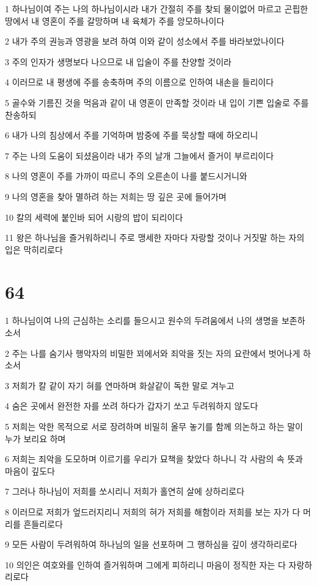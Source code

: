 \par 1 하나님이여 주는 나의 하나님이시라 내가 간절히 주를 찾되 물이없어 마르고 곤핍한 땅에서 내 영혼이 주를 갈망하며 내 육체가 주를 앙모하나이다
\par 2 내가 주의 권능과 영광을 보려 하여 이와 같이 성소에서 주를 바라보았나이다
\par 3 주의 인자가 생명보다 나으므로 내 입술이 주를 찬양할 것이라
\par 4 이러므로 내 평생에 주를 송축하며 주의 이름으로 인하여 내손을 들리이다
\par 5 골수와 기름진 것을 먹음과 같이 내 영혼이 만족할 것이라 내 입이 기쁜 입술로 주를 찬송하되
\par 6 내가 나의 침상에서 주를 기억하며 밤중에 주를 묵상할 때에 하오리니
\par 7 주는 나의 도움이 되셨음이라 내가 주의 날개 그늘에서 즐거이 부르리이다
\par 8 나의 영혼이 주를 가까이 따르니 주의 오른손이 나를 붙드시거니와
\par 9 나의 영혼을 찾아 멸하려 하는 저희는 땅 깊은 곳에 들어가며
\par 10 칼의 세력에 붙인바 되어 시랑의 밥이 되리이다
\par 11 왕은 하나님을 즐거워하리니 주로 맹세한 자마다 자랑할 것이나 거짓말 하는 자의 입은 막히리로다

\chapter{64}

\par 1 하나님이여 나의 근심하는 소리를 들으시고 원수의 두려움에서 나의 생명을 보존하소서
\par 2 주는 나를 숨기사 행악자의 비밀한 꾀에서와 죄악을 짓는 자의 요란에서 벗어나게 하소서
\par 3 저희가 칼 같이 자기 혀를 연마하며 화살같이 독한 말로 겨누고
\par 4 숨은 곳에서 완전한 자를 쏘려 하다가 갑자기 쏘고 두려워하지 않도다
\par 5 저희는 악한 목적으로 서로 장려하며 비밀히 올무 놓기를 함께 의논하고 하는 말이 누가 보리요 하며
\par 6 저희는 죄악을 도모하며 이르기를 우리가 묘책을 찾았다 하나니 각 사람의 속 뜻과 마음이 깊도다
\par 7 그러나 하나님이 저희를 쏘시리니 저희가 홀연히 살에 상하리로다
\par 8 이러므로 저희가 엎드러지리니 저희의 혀가 저희를 해함이라 저희를 보는 자가 다 머리를 흔들리로다
\par 9 모든 사람이 두려워하여 하나님의 일을 선포하며 그 행하심을 깊이 생각하리로다
\par 10 의인은 여호와를 인하여 즐거워하며 그에게 피하리니 마음이 정직한 자는 다 자랑하리로다

